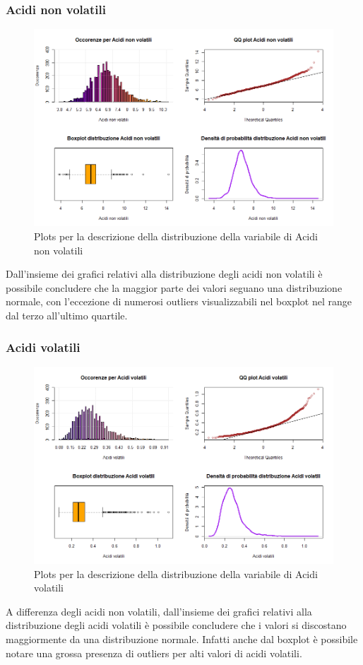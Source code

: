 \documentclass[12pt]{article}
\begin{document}
\subsubsection{Acidi non volatili}
\begin{figure}[!htb]
    \centering
    \includegraphics[width=1\textwidth]{immagini/acnon.png}
    \caption{Plots per la descrizione della distribuzione della variabile di Acidi non volatili}
\end{figure}
\FloatBarrier
Dall'insieme dei grafici relativi alla distribuzione degli acidi non volatili è possibile concludere che la maggior parte dei valori seguano una distribuzione normale, con l'eccezione di numerosi outliers visualizzabili nel boxplot nel range dal terzo all'ultimo quartile.
\newpage
\subsubsection{Acidi volatili}
\begin{figure}[!htb]
    \centering
    \includegraphics[width=1\textwidth]{immagini/acvol.png}
    \caption{Plots per la descrizione della distribuzione della variabile di Acidi volatili}
\end{figure}
\FloatBarrier
A differenza degli acidi non volatili, dall'insieme dei grafici relativi alla distribuzione degli acidi volatili è possibile concludere che i valori si discostano maggiormente da una distribuzione normale. Infatti anche dal boxplot è possibile notare una grossa presenza di outliers per alti valori di acidi volatili.
\newpage
\end{document}
